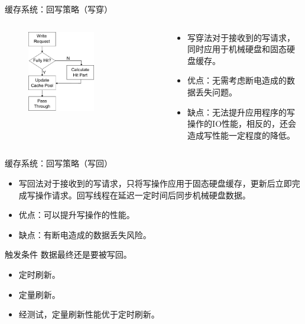 \documentclass[compress]{beamer}
\begin{document}
\begin{frame}{缓存系统：回写策略（写穿）}
    \begin{columns}
    \begin{column}{0.5\textwidth}
        \begin{figure}
        \includegraphics[width=0.6\textwidth]{../graph/write-through}
        \end{figure}
    \end{column}
    \begin{column}{0.5\textwidth}
        \begin{itemize}
        \item 写穿法对于接收到的写请求，同时应用于机械硬盘和固态硬盘缓存。
        \item 优点：无需考虑断电造成的数据丢失问题。
        \item 缺点：无法提升应用程序的写操作的IO性能，相反的，还会造成写性能一定程度的降低。
        \end{itemize}
    \end{column}
    \end{columns}
\end{frame}

\begin{frame}{缓存系统：回写策略（写回）}
\begin{itemize}
\item 写回法对于接收到的写请求，只将写操作应用于固态硬盘缓存，更新后立即完成写操作请求。回写线程在延迟一定时间后同步机械硬盘数据。
\item 优点：可以提升写操作的性能。
\item 缺点：有断电造成的数据丢失风险。
\end{itemize}

\begin{block}{触发条件}
数据最终还是要被写回。
\begin{itemize}
\item 定时刷新。
\item 定量刷新。
\item 经测试，定量刷新性能优于定时刷新。
\end{itemize}
\end{block}
\end{frame}
\end{document}
